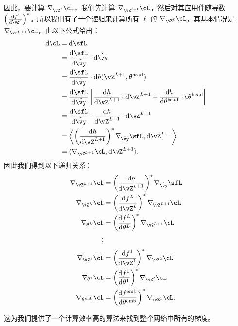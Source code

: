 \documentclass[../../book-main_zh.tex]{subfiles}
\begin{document}
因此，要计算 \(\nabla_{\vZ^{\ell}}\cL\)，我们先计算 \(\nabla_{\vZ^{\ell + 1}}\cL\)，然后对其应用伴随导数 \(\bp{\odv{f^{\ell}}{\vZ^{\ell}}}^{*}\)。所以我们有了一个递归来计算所有 \(\ell\) 的 \(\nabla_{\vZ^{\ell}}\cL\)，其基本情况是 \(\nabla_{\vZ^{L + 1}}\cL\)，由以下公式给出：
\begin{align}
    \odif{\cL}
    &= \odif{\sfL} \\
    &= \odv{\sfL}{\hat{\vy}}\cdot\odif{\hat{\vy}} \\
    &= \odv{\sfL}{\hat{\vy}}\cdot\odif{{h(\vZ^{L + 1}, \theta^{\head})}} \\ 
    &= \odv{\sfL}{\hat{\vy}}\bs{\odv{h}{\vZ^{L + 1}}\cdot\odif{\vZ}^{L + 1} + \odv{h}{\theta^{\head}}\cdot\odif{\theta}^{\head}} \\ 
    &= \odv{\sfL}{\hat{\vy}}\cdot \odv{h}{\vZ^{L + 1}}\cdot\odif{\vZ}^{L + 1} \\ 
    &= \ip*{\bp{\odv{h}{\vZ^{L + 1}}}^{*}\nabla_{\hat{\vy}}\sfL}{\odif{\vZ}^{L + 1}} \\ 
    &= \ip{\nabla_{\vZ^{L + 1}}\cL}{\odif{\vZ}^{L + 1}}.
\end{align}
因此我们得到以下递归关系：
\begin{align}
    \nabla_{\vZ^{L + 1}}\cL 
    &= \bp{\odv{h}{\vZ^{L + 1}}}^{*}\nabla_{\hat{\vy}}\sfL \\ 
    \nabla_{\vZ^{L}}\cL 
    &= \bp{\odv{f^{L}}{\vZ^{L}}}^{*}\nabla_{\vZ^{L + 1}}\cL \\ 
    \nabla_{\theta^{L}}\cL
    &= \bp{\odv{f^{L}}{\theta^{L}}}^{*}\nabla_{\vZ^{L + 1}}\cL \\
    \vdots &  \\ 
    \nabla_{\vZ^{1}}\cL 
    &= \bp{\odv{f^{1}}{\vZ^{1}}}^{*}\nabla_{\vZ^{2}}\cL \\ 
    \nabla_{\theta^{1}}\cL 
    &= \bp{\odv{f^{1}}{\theta^{1}}}^{*}\nabla_{\vZ^{2}}\cL \\ 
    \nabla_{\theta^{\emb}}\cL 
    &= \bp{\odv{f^{\emb}}{\theta^{\emb}}}^{*}\nabla_{\vZ^{1}}\cL.
\end{align}

这为我们提供了一个计算效率高的算法来找到整个网络中所有的梯度。
\end{document}
